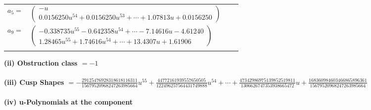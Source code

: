 \documentclass[1p]{elsarticle_modified}
\theoremstyle{definition}
\begin{document}
\begin{tabular}{m{7pt} m{180pt} m{7pt} m{180pt} }
\flushright $a_{5}=$&$\begin{pmatrix}- u\\0.0156250 u^{54}+0.0156250 u^{53}+\cdots+1.07813 u+0.0156250\end{pmatrix}$ \\
\flushright $a_{9}=$&$\begin{pmatrix}-0.338735 u^{55}-0.642358 u^{54}+\cdots-7.14616 u-4.61240\\1.28465 u^{55}+1.74616 u^{54}+\cdots+13.4307 u+1.61906\end{pmatrix}$\\&\end{tabular}
\flushleft \textbf{(ii) Obstruction class $= -1$}\\~\\
\flushleft \textbf{(iii) Cusp Shapes $= -\frac{29125476928318618116311}{15679520968247263985664} u^{55}+\frac{44772161939557650505}{122496257564431749888} u^{54}+\cdots+\frac{47342986975139852519811}{1306626747353938665472} u+\frac{168360984603466865896361}{15679520968247263985664}$}\\~\\
\newpage\renewcommand{\arraystretch}{1}
\flushleft \textbf{(iv) u-Polynomials at the component}\newline \\
\end{document}
